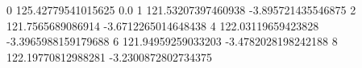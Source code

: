 0 125.42779541015625 0.0
1 121.53207397460938 -3.895721435546875
2 121.7565689086914 -3.6712265014648438
4 122.03119659423828 -3.3965988159179688
6 121.94959259033203 -3.4782028198242188
8 122.19770812988281 -3.2300872802734375
